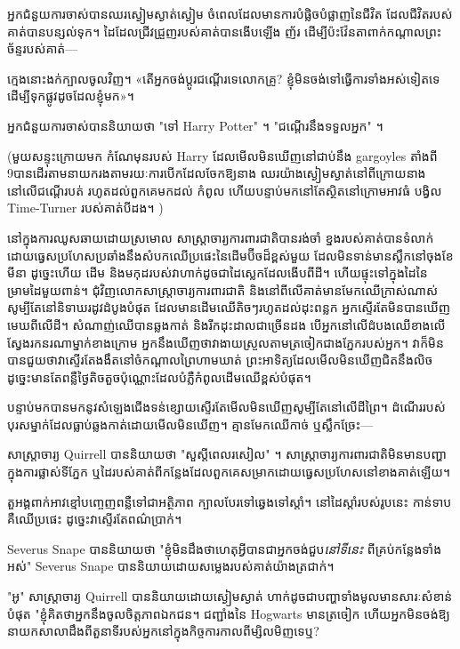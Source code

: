 {{អ្នកជំនួយការចាស់បានឈរស្ងៀមស្ងាត់ស្ងៀម ចំពេលដែលមានការបំផ្លិចបំផ្លាញនៃជីវិត ដែលជីវិតរបស់គាត់បានបន្សល់ទុក។ ដៃ​ដែល​ជ្រីវជ្រួញ​របស់​គាត់​បាន​ងើប​ឡើង ញ័រ ដើម្បី​ប៉ះ​វ៉ែនតា​ពាក់​កណ្តាល​ព្រះ​ច័ន្ទ​របស់​គាត់—

ក្មេង​នោះ​ងក់​ក្បាល​ចូល​វិញ​។​ «​តើ​អ្នក​ចង់​ប្តូរ​ជណ្តើរ​ទេ​លោកគ្រូ​? ខ្ញុំ​មិន​ចង់​ទៅ​ធ្វើ​ការ​ទាំង​អស់​ទៀត​ទេ ដើម្បី​ទុក​ផ្លូវ​ដូច​ដែល​ខ្ញុំ​មក»។

អ្នកជំនួយការចាស់បាននិយាយថា "ទៅ Harry Potter" ។ "ជណ្តើរនឹងទទួលអ្នក" ។

(មួយសន្ទុះក្រោយមក កំណែមុនរបស់ Harry ដែលមើលមិនឃើញនៅជាប់នឹង gargoyles តាំងពី 9\pm បានដើរតាមនាយករងតាមរយៈការបើកដែលចែកឱ្យនាង ឈរយ៉ាងស្ងៀមស្ងាត់នៅពីក្រោយនាងនៅលើជណ្តើរបត់ រហូតដល់ពួកគេមកដល់ កំពូល ហើយបន្ទាប់មកនៅតែស្ថិតនៅក្រោមអាវធំ បង្វិល Time-Turner របស់គាត់បីដង។ )


នៅក្នុងការឈូសឆាយដោយស្រមោល សាស្ត្រាចារ្យការពារជាតិបានរង់ចាំ ខ្នងរបស់គាត់បានទំលាក់ដោយធ្វេសប្រហែសប្រឆាំងនឹងសំបកឈើប្រផេះនៃដើមប៊ីចដ៏ខ្ពស់មួយ ដែលមិនទាន់មានស្លឹកនៅចុងខែមីនា ដូច្នេះហើយ ដើម និងមកុដរបស់វាហាក់ដូចជាដៃស្លេកដែលងើបពីដី។ ហើយផ្ទុះទៅក្នុងដៃនៃម្រាមដៃមួយពាន់។ ជុំវិញលោកសាស្ត្រាចារ្យការពារជាតិ និងនៅពីលើគាត់មានមែកឈើក្រាស់ណាស់ សូម្បីតែនៅនិទាឃរដូវដំបូងបំផុត ដែលមានដើមឈើតិចៗរហូតដល់ដុះពន្លក អ្នកស្ទើរតែមិនបានឃើញមេឃពីលើដី។ សំណាញ់ឈើបានឆ្លងកាត់ និងរីកដុះដាលជាច្រើនដង បើអ្នកនៅលើដំបងឈើខាងលើ ស្វែងរកនរណាម្នាក់ខាងក្រោម អ្នកនឹងឃើញថាវាងាយស្រួលតាមត្រចៀកជាងភ្នែករបស់អ្នក។ វាក៏មិនបានជួយថាវាស្ទើរតែងងឹតនៅចំកណ្តាលព្រៃហាមឃាត់ ព្រះអាទិត្យដែលមើលមិនឃើញជិតនឹងលិច ដូច្នេះមានតែពន្លឺថ្ងៃតិចតួចប៉ុណ្ណោះដែលបំភ្លឺកំពូលដើមឈើខ្ពស់បំផុត។

បន្ទាប់​មក​បាន​មក​នូវ​សំឡេង​ជើង​ទន់​ខ្សោយ​ស្ទើរ​តែ​មើល​មិន​ឃើញ​សូម្បី​តែ​នៅ​លើ​ដី​ព្រៃ​។ ដំណើររបស់បុរសម្នាក់ដែលធ្លាប់ឆ្លងកាត់ដោយមើលមិនឃើញ។ គ្មាន​មែក​ឈើ​កាច់ ឬ​ស្លឹក​ច្រែះ—

សាស្រ្តាចារ្យ Quirrell បាននិយាយថា "សួស្តីពេលរសៀល" ។ សាស្ត្រាចារ្យ​ការពារ​ជាតិ​មិន​មាន​បញ្ហា​ក្នុង​ការ​ផ្លាស់ទី​ភ្នែក ឬ​ដៃ​របស់​គាត់​ពី​កន្លែង​ដែល​ពួកគេ​សម្រាក​ដោយ​ធ្វេសប្រហែស​នៅ​ខាង​គាត់​ឡើយ។

តួ​អង្គ​ពាក់​អាវ​ខ្មៅ​បញ្ចេញ​ពន្លឺ​ទៅ​ជា​អត្ថិភាព ក្បាល​បែរ​ទៅ​ឆ្វេង​ទៅ​ស្តាំ។ នៅ​ដៃ​ស្តាំ​របស់​រូប​នេះ កាន់​ទាប​គឺ​ឈើ​ប្រផេះ ដូច្នេះ​វា​ស្ទើរ​តែ​ពណ៌​ប្រាក់។

Severus Snape បាននិយាយថា "ខ្ញុំមិនដឹងថាហេតុអ្វីបានជាអ្នកចង់ជួប\emph{នៅទីនេះ} ពីគ្រប់កន្លែងទាំងអស់" Severus Snape បាននិយាយដោយសម្លេងរបស់គាត់យ៉ាងត្រជាក់។

"អូ" សាស្រ្តាចារ្យ Quirrell បាននិយាយដោយស្ងៀមស្ងាត់ ហាក់ដូចជាបញ្ហាទាំងមូលមានសារៈសំខាន់បំផុត "ខ្ញុំគិតថាអ្នកនឹងចូលចិត្តភាពឯកជន។ ជញ្ជាំងនៃ Hogwarts មានត្រចៀក ហើយអ្នកមិនចង់ឱ្យនាយកសាលាដឹងពីតួនាទីរបស់អ្នកនៅក្នុងកិច្ចការកាលពីម្សិលមិញទេឬ?

}}
